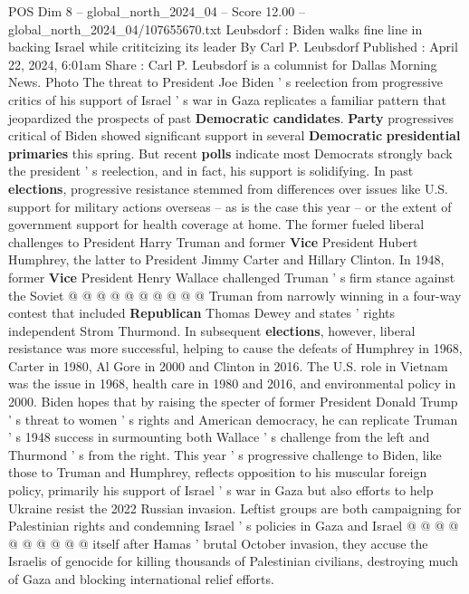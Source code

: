 \begin{textsample}{POS Dim 8 – global\_north\_2024\_04 – Score 12.00 – global\_north\_2024\_04/107655670.txt}  \label{ex:f8_pos_059}
Leubsdorf : Biden walks fine line in backing Israel while crititcizing its leader By Carl P.
Leubsdorf Published : April 22, 2024, 6:01am Share : Carl P.
Leubsdorf is a columnist for Dallas Morning News.
Photo The threat to President Joe Biden ' s reelection from progressive critics of his support of Israel ' s war in Gaza replicates a familiar pattern that jeopardized the prospects of past \textbf{Democratic} \textbf{candidates}. \textbf{Party} progressives critical of Biden showed significant support in several \textbf{Democratic} \textbf{presidential} \textbf{primaries} this spring.
But recent \textbf{polls} indicate most Democrats strongly back the president ' s reelection, and in fact, his support is solidifying.
In past \textbf{elections}, progressive resistance stemmed from differences over issues like U.S. support for military actions overseas -- as is the case this year -- or the extent of government support for health coverage at home.
The former fueled liberal challenges to President Harry Truman and former \textbf{Vice} President Hubert Humphrey, the latter to President Jimmy Carter and Hillary Clinton.
In 1948, former \textbf{Vice} President Henry Wallace challenged Truman ' s firm stance against the Soviet @ @ @ @ @ @ @ @ @ @ Truman from narrowly winning in a four-way contest that included \textbf{Republican} Thomas Dewey and states ' rights independent Strom Thurmond.
In subsequent \textbf{elections}, however, liberal resistance was more successful, helping to cause the defeats of Humphrey in 1968, Carter in 1980, Al Gore in 2000 and Clinton in 2016.
The U.S. role in Vietnam was the issue in 1968, health care in 1980 and 2016, and environmental policy in 2000.
Biden hopes that by raising the specter of former President Donald Trump ' s threat to women ' s rights and American democracy, he can replicate Truman ' s 1948 success in surmounting both Wallace ' s challenge from the left and Thurmond ' s from the right.
This year ' s progressive challenge to Biden, like those to Truman and Humphrey, reflects opposition to his muscular foreign policy, primarily his support of Israel ' s war in Gaza but also efforts to help Ukraine resist the 2022 Russian invasion.
Leftist groups are both campaigning for Palestinian rights and condemning Israel ' s policies in Gaza and Israel @ @ @ @ @ @ @ @ @ @ itself after Hamas ' brutal October invasion, they accuse the Israelis of genocide for killing thousands of Palestinian civilians, destroying much of Gaza and blocking international relief efforts.

\end{textsample}
